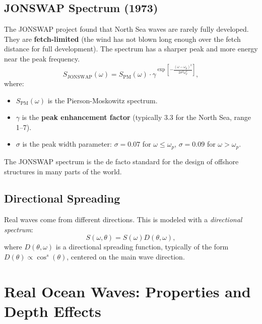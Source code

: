 \documentclass[11pt,a4paper]{article}
\begin{document}
\subsection{JONSWAP Spectrum (1973)}
The JONSWAP project found that North Sea waves are rarely fully developed. They are \textbf{fetch-limited} (the wind has not blown long enough over the fetch distance for full development). The spectrum has a sharper peak and more energy near the peak frequency.
\begin{equation}
S_{\text{JONSWAP}}(\omega) = S_{\text{PM}}(\omega) \cdot \gamma^{\exp\left[-\frac{(\omega - \omega_p)^2}{2\sigma^2\omega_p^2}\right]},
\end{equation}
where:
\begin{itemize}
    \item $S_{\text{PM}}(\omega)$ is the Pierson-Moskowitz spectrum.
    \item $\gamma$ is the \textbf{peak enhancement factor} (typically 3.3 for the North Sea, range 1–7).
    \item $\sigma$ is the peak width parameter: $\sigma = 0.07$ for $\omega \leq \omega_p$, $\sigma = 0.09$ for $\omega > \omega_p$.
\end{itemize}
The JONSWAP spectrum is the de facto standard for the design of offshore structures in many parts of the world.

\subsection{Directional Spreading}
Real waves come from different directions. This is modeled with a \emph{directional spectrum}:
\begin{equation}
S(\omega, \theta) = S(\omega) D(\theta, \omega),
\end{equation}
where $D(\theta, \omega)$ is a directional spreading function, typically of the form $D(\theta) \propto \cos^s(\theta)$, centered on the main wave direction.

\section{Real Ocean Waves: Properties and Depth Effects}
\end{document}
